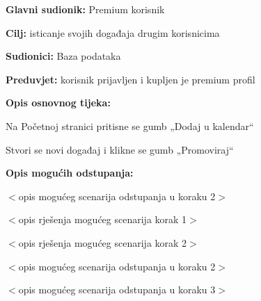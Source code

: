 	\noindent {}
\begin{packed_item}
	
	\item \textbf{Glavni sudionik: }Premium korisnik
	\item  \textbf{Cilj:} isticanje svojih događaja drugim korisnicima
	\item  \textbf{Sudionici:}
	Baza podataka
	\item  \textbf{Preduvjet:} korisnik prijavljen i kupljen je premium profil
	\item  \textbf{Opis osnovnog tijeka:}
	
	\item[] \begin{packed_enum}
		
		\item	Na Početnoj stranici pritisne se gumb „Dodaj u kalendar“
		\item	Stvori se novi događaj i klikne se gumb „Promoviraj“
		
	\end{packed_enum}
	
	\item  \textbf{Opis mogućih odstupanja:}
	
	\item[] \begin{packed_item}
		
		\item[2.a] $<$opis mogućeg scenarija odstupanja u koraku 2$>$
		\item[] \begin{packed_enum}
			
			\item $<$opis rješenja mogućeg scenarija korak 1$>$
			\item $<$opis rješenja mogućeg scenarija korak 2$>$
			
		\end{packed_enum}
		\item[2.b] $<$opis mogućeg scenarija odstupanja u koraku 2$>$
		\item[3.a] $<$opis mogućeg scenarija odstupanja  u koraku 3$>$
		
	\end{packed_item}
\end{packed_item}

